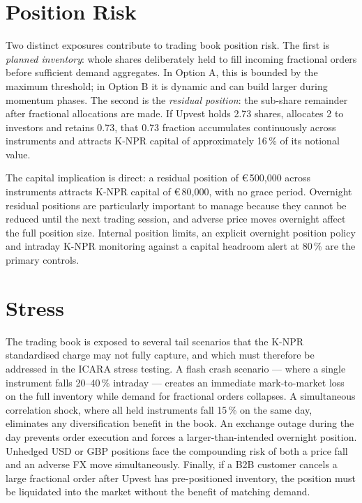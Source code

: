 \documentclass[12pt,a4paper]{report}
\newcommand{\eur}{\euro\,}
\begin{document}
\section{Position Risk}

Two distinct exposures contribute to trading book position risk. The first is
\textit{planned inventory}: whole shares deliberately held to fill incoming fractional
orders before sufficient demand aggregates. In Option A, this is bounded by the maximum
threshold; in Option B it is dynamic and can build larger during momentum phases. The
second is the \textit{residual position}: the sub-share remainder after fractional
allocations are made. If Upvest holds 2.73 shares, allocates 2 to investors and retains
0.73, that 0.73 fraction accumulates continuously across instruments and attracts K-NPR
capital of approximately 16\,\% of its notional value.

The capital implication is direct: a residual position of \eur{}500{,}000 across
instruments attracts K-NPR capital of \eur{}80{,}000, with no grace period. Overnight
residual positions are particularly important to manage because they cannot be reduced
until the next trading session, and adverse price moves overnight affect the full
position size. Internal position limits, an explicit overnight position policy and
intraday K-NPR monitoring against a capital headroom alert at 80\,\% are the primary
controls.

\section{Stress}

The trading book is exposed to several tail scenarios that the K-NPR standardised
charge may not fully capture, and which must therefore be addressed in the ICARA stress
testing. A flash crash scenario --- where a single instrument falls 20--40\,\% intraday
--- creates an immediate mark-to-market loss on the full inventory while demand for
fractional orders collapses. A simultaneous correlation shock, where all held instruments
fall 15\,\% on the same day, eliminates any diversification benefit in the book. An
exchange outage during the day prevents order execution and forces a larger-than-intended
overnight position. Unhedged USD or GBP positions face the compounding risk of both a
price fall and an adverse FX move simultaneously. Finally, if a B2B customer cancels a
large fractional order after Upvest has pre-positioned inventory, the position must be
liquidated into the market without the benefit of matching demand.
\end{document}
